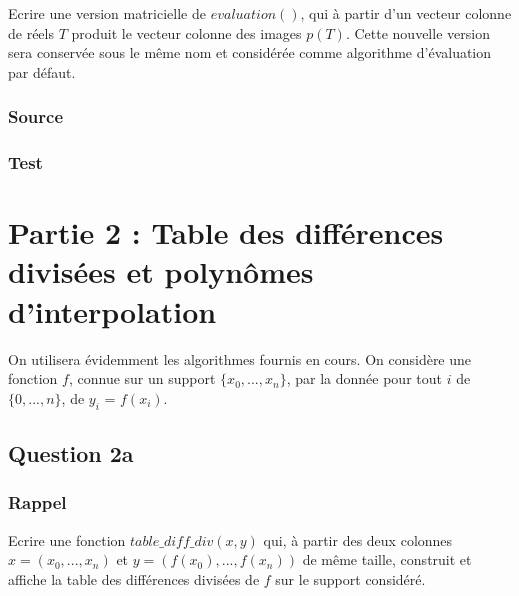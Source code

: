 \documentclass[a4paper,10pt]{report}
\begin{document}
Ecrire une version matricielle de $evaluation()$, qui à partir d’un vecteur
colonne de réels $T$ produit le vecteur colonne des images $p(T)$. Cette nouvelle
version sera conservée sous le même nom et considérée comme algorithme
d’évaluation par défaut.

\subsection*{Source}

%

\subsection*{Test}

\begin{center}
%	
\end{center}

\chapter*{Partie 2 : Table des différences divisées et polynômes d’interpolation}

On utilisera évidemment les algorithmes fournis en cours. On considère une
fonction $f$, connue sur un support $\lbrace x_{0},...,x_{n}\rbrace$, par la donnée pour tout $i$ de $\lbrace 0,...,n \rbrace$, de $y_{i}$ = $f(x_{i})$.

\section*{Question 2a}

\subsection*{Rappel}

Ecrire une fonction $table\_diff\_div(x, y)$ qui, à partir des deux colonnes $x = (x_{0},...,x_{n})$ et $y = (f(x_{0}),...,f(x_{n}))$ de même taille, construit et affiche la table des différences divisées de $f$ sur le support considéré.
\end{document}
